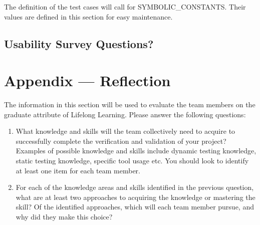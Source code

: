 \documentclass[12pt, titlepage]{article}
\begin{document}
The definition of the test cases will call for SYMBOLIC\_CONSTANTS.
Their values are defined in this section for easy maintenance.

\subsection{Usability Survey Questions?}


\newpage{}
\section*{Appendix --- Reflection}

The information in this section will be used to evaluate the team members on the
graduate attribute of Lifelong Learning.  Please answer the following questions:

\begin{enumerate}
  \item What knowledge and skills will the team collectively need to acquire to
  successfully complete the verification and validation of your project?
  Examples of possible knowledge and skills include dynamic testing knowledge,
  static testing knowledge, specific tool usage etc.  You should look to
  identify at least one item for each team member.
  \item For each of the knowledge areas and skills identified in the previous
  question, what are at least two approaches to acquiring the knowledge or
  mastering the skill?  Of the identified approaches, which will each team
  member pursue, and why did they make this choice?
\end{enumerate}
\end{document}
